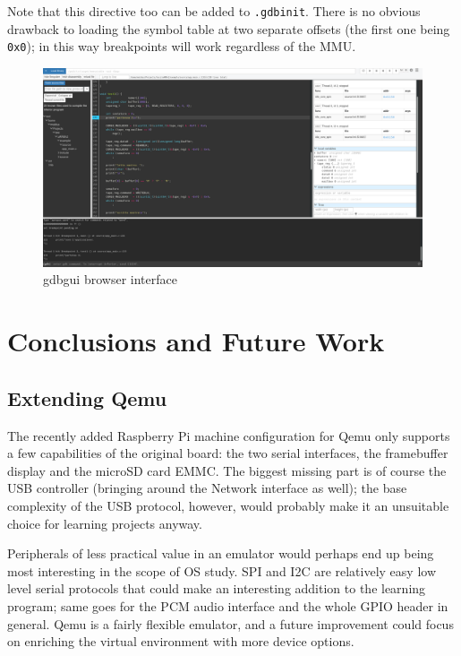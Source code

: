\documentclass[12pt,a4paper,openright,twoside]{report}
\begin{document}
Note that this directive too can be added to {\tt .gdbinit}. There is no 
obvious drawback to loading the symbol table at two separate offsets (the first
one being {\tt 0x0}); in this way breakpoints will work regardless of the MMU.


 \begin{figure}[t]
 \includegraphics[scale=0.34,angle=-90,origin=c]{images/tesi4.png}
 \caption[Figure 4]{gdbgui browser interface}\label{fig:gdbgui}
 \end{figure}





\clearpage{\pagestyle{empty}\cleardoublepage}
\chapter{Conclusions and Future Work}
\section{Extending Qemu}
The recently added Raspberry Pi machine configuration for Qemu only supports a few
capabilities of the original board: the two serial interfaces, the framebuffer
display and the microSD card EMMC.
The biggest missing part is of course the USB controller (bringing around the
Network interface as well); the base complexity of the USB protocol, however,
 would probably make it an unsuitable choice for learning projects anyway.

Peripherals of less practical value in an emulator would perhaps end up being
most interesting in the scope of OS study. SPI and I2C are relatively
easy low level serial protocols that could make an interesting addition to the
learning program; same goes for the PCM audio interface and the whole GPIO 
header in general.
Qemu is a fairly flexible emulator, and a future improvement could focus on 
enriching the virtual environment with more device options.
\end{document}
